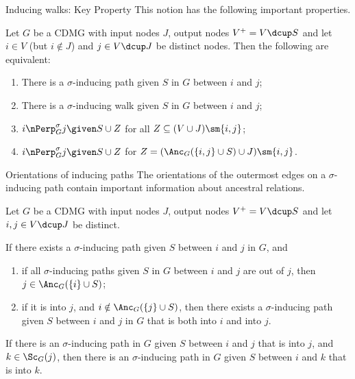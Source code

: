 \begin{frame}{Inducing walks: Key Property}
This notion has the following important properties.
\begin{Prp}[\ref{prp:sigma-inducing_path_properties}]
  Let $G$ be a CDMG with input nodes $J$, output nodes $V^+ = V \dcup S$ and let $i \in V$ (but $i \notin J$) and $j \in V \dcup J$ be distinct nodes. 
  Then the following are equivalent:
  \begin{enumerate}
    \item There is a $\sigma$-inducing path given $S$ in $G$ between $i$ and $j$;
    \item There is a $\sigma$-inducing walk given $S$ in $G$ between $i$ and $j$;
    \item $i \nPerp^\sigma_G j \given S \cup Z$ for all $Z \subseteq (V \cup J) \sm \{i,j\}$;
    \item $i \nPerp^\sigma_G j \given S \cup Z$ for $Z = (\Anc_G(\{i,j\} \cup S) \cup J) \sm \{i,j\}$.
  \end{enumerate}
\end{Prp}
\end{frame}

\begin{frame}{Orientations of inducing paths}
The orientations of the outermost edges on a $\sigma$-inducing path contain important information about ancestral relations.

Let $G$ be a CDMG with input nodes $J$, output nodes $V^+ = V \dcup S$ and let $i,j \in V \dcup J$ be distinct.
  \begin{Lem}[\ref{lem:sigma-inducing_path_out-of} \& \ref{lem:sigma-inducing_path_into_into}]
  If there exists a $\sigma$-inducing path given $S$ between $i$ and $j$ in $G$, and
  \begin{enumerate}
      \item if all $\sigma$-inducing paths given $S$ in $G$ between $i$ and $j$ are out of $j$, then $j \in \Anc_G(\{i\} \cup S)$;
      \item if it is into $j$, and $i \notin \Anc_G(\{j\} \cup S)$, then there exists a $\sigma$-inducing path given $S$ between $i$ and $j$ in $G$ that is both into $i$ and into $j$.
  \end{enumerate}
\end{Lem}
\begin{Lem}[\ref{lem:induced_path_into_scc}]
If there is an $\sigma$-inducing path in $G$ given $S$ between $i$ and $j$ that is into $j$, and $k \in \Sc_G(j)$, then there is an $\sigma$-inducing path in $G$ given $S$ between $i$ and $k$ that is into $k$.
\end{Lem}
\end{frame}

